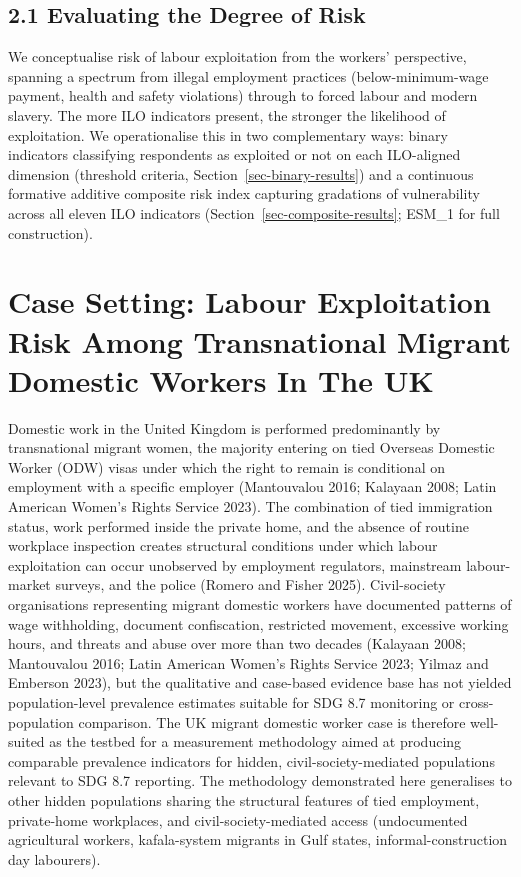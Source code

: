 \documentclass[
  12pt,
  letterpaper,
  DIV=11,
  numbers=noendperiod]{scrartcl}
\begin{document}
\subsection{2.1 Evaluating the Degree of Risk}\label{sec-degree-of-risk}

We conceptualise risk of labour exploitation from the workers'
perspective, spanning a spectrum from illegal employment practices
(below-minimum-wage payment, health and safety violations) through to
forced labour and modern slavery. The more ILO indicators present, the
stronger the likelihood of exploitation. We operationalise this in two
complementary ways: binary indicators classifying respondents as
exploited or not on each ILO-aligned dimension (threshold criteria,
Section~\ref{sec-binary-results}) and a continuous formative additive
composite risk index capturing gradations of vulnerability across all
eleven ILO indicators (Section~\ref{sec-composite-results}; ESM\_1 for
full construction).

\section{Case Setting: Labour Exploitation Risk Among Transnational
Migrant Domestic Workers In The UK}\label{sec-case-setting}

Domestic work in the United Kingdom is performed predominantly by
transnational migrant women, the majority entering on tied Overseas
Domestic Worker (ODW) visas under which the right to remain is
conditional on employment with a specific employer (Mantouvalou 2016;
Kalayaan 2008; Latin American Women's Rights Service 2023). The
combination of tied immigration status, work performed inside the
private home, and the absence of routine workplace inspection creates
structural conditions under which labour exploitation can occur
unobserved by employment regulators, mainstream labour-market surveys,
and the police (Romero and Fisher 2025). Civil-society organisations
representing migrant domestic workers have documented patterns of wage
withholding, document confiscation, restricted movement, excessive
working hours, and threats and abuse over more than two decades
(Kalayaan 2008; Mantouvalou 2016; Latin American Women's Rights Service
2023; Yilmaz and Emberson 2023), but the qualitative and case-based
evidence base has not yielded population-level prevalence estimates
suitable for SDG 8.7 monitoring or cross-population comparison. The UK
migrant domestic worker case is therefore well-suited as the testbed for
a measurement methodology aimed at producing comparable prevalence
indicators for hidden, civil-society-mediated populations relevant to
SDG 8.7 reporting. The methodology demonstrated here generalises to
other hidden populations sharing the structural features of tied
employment, private-home workplaces, and civil-society-mediated access
(undocumented agricultural workers, kafala-system migrants in Gulf
states, informal-construction day labourers).
\end{document}
